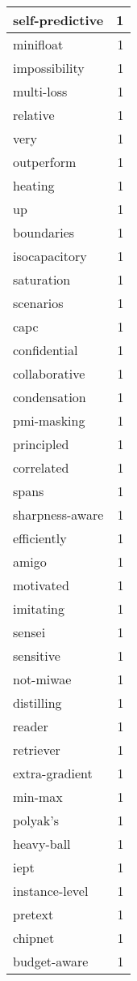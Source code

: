 \begin{table}[h]
\begin{tabular}{|l|r|}
\hline
self-predictive & 1 \\
\hline
minifloat & 1 \\
\hline
impossibility & 1 \\
\hline
multi-loss & 1 \\
\hline
relative & 1 \\
\hline
very & 1 \\
\hline
outperform & 1 \\
\hline
heating & 1 \\
\hline
up & 1 \\
\hline
boundaries & 1 \\
\hline
isocapacitory & 1 \\
\hline
saturation & 1 \\
\hline
scenarios & 1 \\
\hline
capc & 1 \\
\hline
confidential & 1 \\
\hline
collaborative & 1 \\
\hline
condensation & 1 \\
\hline
pmi-masking & 1 \\
\hline
principled & 1 \\
\hline
correlated & 1 \\
\hline
spans & 1 \\
\hline
sharpness-aware & 1 \\
\hline
efficiently & 1 \\
\hline
amigo & 1 \\
\hline
motivated & 1 \\
\hline
imitating & 1 \\
\hline
sensei & 1 \\
\hline
sensitive & 1 \\
\hline
not-miwae & 1 \\
\hline
distilling & 1 \\
\hline
reader & 1 \\
\hline
retriever & 1 \\
\hline
extra-gradient & 1 \\
\hline
min-max & 1 \\
\hline
polyak's & 1 \\
\hline
heavy-ball & 1 \\
\hline
iept & 1 \\
\hline
instance-level & 1 \\
\hline
pretext & 1 \\
\hline
chipnet & 1 \\
\hline
budget-aware & 1 \\

\end{tabular}
\end{table}
